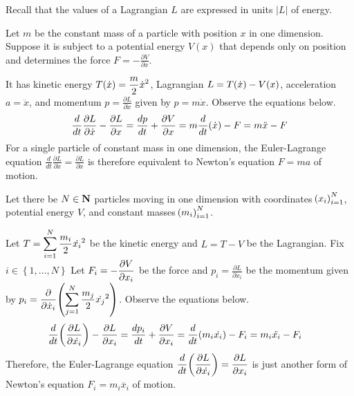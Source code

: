 Recall that the values of a Lagrangian $L$ are expressed in units $\left|L\right|$ of energy.

\begin{answer}
	Let $m$ be the constant mass of a particle with position $x$ in one dimension.
	Suppose it is subject to a potential energy $V(x)$ that depends only on position and determines the force $F = - \frac{\partial V}{\partial x}$.

	It has kinetic energy $\displaystyle T\!\left(\dot{x}\right) = \frac{m}{2} \dot{x}^2$, Lagrangian $L = T\!\left(\dot{x}\right) - V\!\left(x\right)$, acceleration $a = \ddot{x}$, and momentum $p = \frac{\partial L}{\partial \dot{x}}$ given by $p = m \dot{x}$.
	Observe the equations below.
	\begin{align}
		\frac{d}{dt} \frac{\partial L}{\partial \dot{x}} - \frac{\partial L}{\partial x}
		= \frac{dp}{dt} + \frac{\partial V}{\partial x}
		= m \frac{d}{dt}\!\left(\dot{x}\right) - F
		= m \ddot{x} - F
	\end{align}
	For a single particle of constant mass in one dimension, the Euler-Lagrange equation $\frac{d}{dt} \frac{\partial L}{\partial \dot{x}} = \frac{\partial L}{\partial x}$ is therefore equivalent to Newton's equation $F = ma$ of motion.
\end{answer}

\begin{answer}
	Let there be $N \in \mathbf{N}$ particles moving in one dimension with coordinates $\!\left(x_i\right)_{i=1}^N$, potential energy $V$, and constant masses $\!\left(m_i\right)_{i=1}^N$.

	Let $\displaystyle T = \sum_{i=1}^N \frac{m_i}{2} \dot{x_i}^2$ be the kinetic energy and $L = T - V$ be the Lagrangian.
	Fix $i \in \left\{1, \dots, N\right\}$
	Let $\displaystyle F_i = - \frac{\partial V}{\partial x_i}$ be the force and $p_i = \frac{\partial L}{\partial \dot{x}_i}$ be the momentum given by $\displaystyle p_i = \frac{\partial}{\partial \dot{x}_i}\!\left(\sum_{j=1}^N \frac{m_j}{2} \dot{x_j}^2\right)$.
	Observe the equations below.
	\begin{align}
		\frac{d}{dt}\!\left(\frac{\partial L}{\partial \dot{x_i}}\right) - \frac{\partial L}{\partial x_i}
		 & = \frac{d p_i}{dt} + \frac{\partial V}{\partial x_i}
		= \frac{d}{dt}\!\left(m_i\dot{x_i}\right) - F_i = m_i\ddot{x_i} - F_i
	\end{align}
	Therefore, the Euler-Lagrange equation $\displaystyle \frac{d}{dt}\!\left(\frac{\partial L}{\partial \dot{x_i}}\right) = \frac{\partial L}{\partial x_i}$ is just another form of Newton's equation $F_i = m_i \ddot{x_i}$ of motion.
\end{answer}

